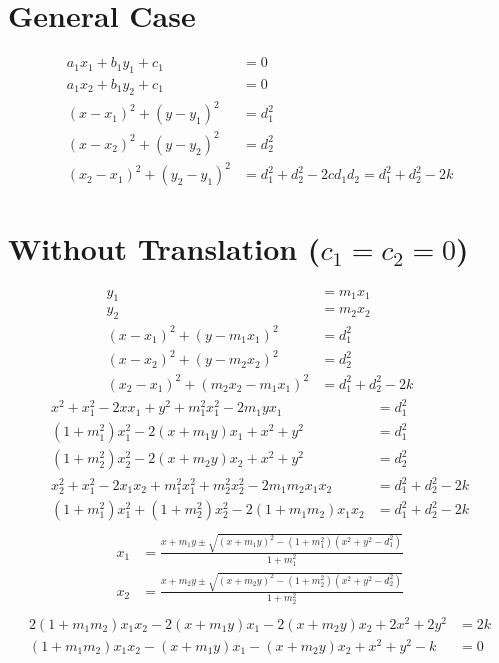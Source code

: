\documentclass{article}
\begin{document}
\section{General Case}
\begin{align*}
  a_1 x_1 + b_1 y_1 + c_1 & = 0\\
  a_1 x_2 + b_1 y_2 + c_1 & = 0\\
  (x - x_1)^2 + (y - y_1)^2 & = d_1^2\\
  (x - x_2)^2 + (y - y_2)^2 & = d_2^2\\
  (x_2 - x_1)^2 + (y_2 - y_1)^2 & = d_1^2 + d_2^2 - 2 c d_1 d_2 = d_1^2 + d_2^2 - 2 k
\end{align*}
\section{Without Translation ($c_1 = c_2 = 0$)}
\begin{align*}
  y_1 & = m_1 x_1\\
  y_2 & = m_2 x_2\\
  (x - x_1)^2 + (y - m_1 x_1)^2 & = d_1^2\\
  (x - x_2)^2 + (y - m_2 x_2)^2 & = d_2^2\\
  (x_2 - x_1)^2 + (m_2 x_2 - m_1 x_1)^2 & = d_1^2 + d_2^2 - 2 k
\end{align*}
\begin{align*}
  x^2 + x_1^2 - 2 x x_1 + y^2 + m_1^2x_1^2 - 2 m_1 y x_1 &= d_1^2\\
  (1 + m_1^2) x_1^2 - 2 (x + m_1 y) x_1  + x^2 + y^2  &= d_1^2\\
  (1 + m_2^2) x_2^2 - 2 (x + m_2 y) x_2  + x^2 + y^2  &= d_2^2\\
  x_2^2 + x_1^2 - 2 x_1 x_2 + m_1^2 x_1^2 + m_2^2 x_2^2 - 2 m_1 m_2 x_1 x_2 &= d_1^2 + d_2^2 - 2 k\\
  (1 + m_1^2) x_1^2 + (1 + m_2^2) x_2^2 - 2 (1 + m_1 m_2) x_1 x_2 &= d_1^2 + d_2^2 - 2 k\\
\end{align*}
\begin{align*}
  x_1 &= \frac{x + m_1 y \pm \sqrt{(x + m_1 y)^2 - (1 + m_1^2)(x^2 + y^2 - d_1^2)}}{1 + m_1^2}\\
  x_2 &= \frac{x + m_2 y \pm \sqrt{(x + m_2 y)^2 - (1 + m_2^2)(x^2 + y^2 - d_2^2)}}{1 + m_2^2}\\
\end{align*}
\begin{align*}
  2 (1 + m_1 m_2) x_1 x_2 - 2 (x + m_1 y) x_1 - 2 (x + m_2 y) x_2 + 2 x^2 + 2 y^2 &= 2 k\\
  (1 + m_1 m_2) x_1 x_2 - (x + m_1 y) x_1 - (x + m_2 y) x_2 + x^2 + y^2 - k &= 0\\
\end{align*}
\end{document}
